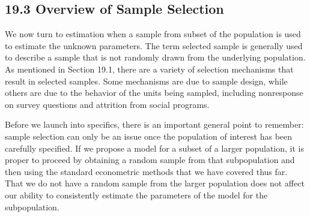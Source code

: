 \documentclass[10pt]{article}
\begin{document}
\subsection*{19.3 Overview of Sample Selection}
We now turn to estimation when a sample from subset of the population is used to estimate the unknown parameters. The term selected sample is generally used to describe a sample that is not randomly drawn from the underlying population. As mentioned in Section 19.1, there are a variety of selection mechanisms that result in selected samples. Some mechanisms are due to sample design, while others are due to the behavior of the units being sampled, including nonresponse on survey questions and attrition from social programs.

Before we launch into specifics, there is an important general point to remember: sample selection can only be an issue once the population of interest has been carefully specified. If we propose a model for a subset of a larger population, it is proper to proceed by obtaining a random sample from that subpopulation and then using the standard econometric methods that we have covered thus far. That we do not have a random sample from the larger population does not affect our ability to consistently estimate the parameters of the model for the subpopulation.
\end{document}
